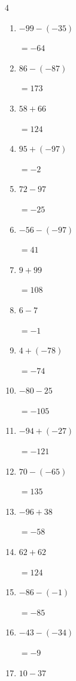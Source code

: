 \begin{multicols}{4}
\begin{enumerate}
        $=-67$

  \item $-99-(-35)$

        $=-64$

  \item $86-(-87)$

        $=173$

  \item $58+66$

        $=124$

  \item $95+(-97)$

        $=-2$

  \item $72-97$

        $=-25$

  \item $-56-(-97)$

        $=41$

  \item $9+99$

        $=108$

  \item $6-7$

        $=-1$

\columnbreak %

  \item $4+(-78)$

        $=-74$

  \item $-80-25$

        $=-105$

  \item $-94+(-27)$

        $=-121$

  \item $70-(-65)$

        $=135$

  \item $-96+38$

        $=-58$

  \item $62+62$

        $=124$

  \item $-86-(-1)$

        $=-85$

  \item $-43-(-34)$

        $=-9$

  \item $10-37$


\end{enumerate}
\end{multicols}

